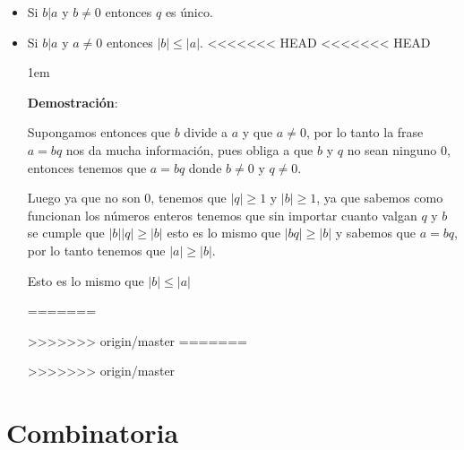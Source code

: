 \documentclass[12pt]{report}                                    %
\newenvironment{SmallIndentation}[1][0.75em]                    %
    {\begin{adjustwidth}{#1}{}\begin{footnotesize}}                 %
    {\end{footnotesize}\end{adjustwidth}}                           %
\begin{document}
            \begin{itemize}
                \item Si $b|a$ y $b \neq 0$ entonces $q$ es único.

                \item Si $b|a$ y $a \neq 0$ entonces $|b| \leq |a|$.
<<<<<<< HEAD
<<<<<<< HEAD
                \begin{SmallIndentation}[1em]
                    \textbf{Demostración}:

                    Supongamos entonces que $b$ divide a $a$ y que $a \neq 0$, por lo tanto
                    la frase $a = bq$ nos da mucha información, pues obliga a que $b$ y $q$
                    no sean ninguno $0$, entonces tenemos que $a = bq$ donde $b \neq 0$ y 
                    $q \neq 0$.

                    Luego ya que no son 0, tenemos que $|q| \geq 1$ y $|b| \geq 1$, ya que sabemos
                    como funcionan los números enteros tenemos que sin importar cuanto valgan $q$ y $b$
                    se cumple que $|b||q| \geq |b|$ esto es lo mismo que $|bq| \geq |b|$ y sabemos que
                    $a = bq$, por lo tanto tenemos que $|a| \geq |b|$.

                    Esto es lo mismo que $|b| \leq |a|$

                \end{SmallIndentation}

=======

                
>>>>>>> origin/master
=======

                
>>>>>>> origin/master
            \end{itemize}
                











\chapter{Combinatoria}
    \clearpage

\end{document}
